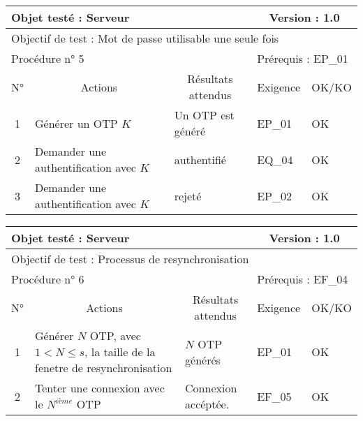 \documentclass{"../../res/univ-projet"}
\begin{document}
\begin{center}
    \begin{tabular}{|c|p{5cm}|p{5cm}|p{1.5cm}|p{1.5cm}|}
      \hline
      \multicolumn{3}{|l|}{Objet testé : Serveur} & \multicolumn{2}{c|}{Version : 1.0}\\ \hline
      \multicolumn{5}{|l|}{Objectif de test : Mot de passe utilisable une seule fois}\\ \hline
      \multicolumn{3}{|l|}{Procédure n° 5} & \multicolumn{2}{p{3cm}|}{Prérequis : EP\_01}\\ \hline
      \multicolumn{1}{|c|}{N°} & \multicolumn{1}{c|}{Actions} & \multicolumn{1}{c|}{Résultats attendus} & 
      \multicolumn{1}{c|}{Exigence} & \multicolumn{1}{c|}{OK/KO}\\ \hline
      1 & Générer un OTP $K$& Un OTP est généré & EP\_01 & OK \\
      2 & Demander une authentification avec $K$ & authentifié & EQ\_04 & OK\\
      3 & Demander une authentification avec $K$ & rejeté & EP\_02 & OK\\ \hline
    \end{tabular}
    \begin{tabular}{|c|p{5cm}|p{5cm}|p{1.5cm}|p{1.5cm}|}
      \hline
      \multicolumn{3}{|l|}{Objet testé : Serveur} & \multicolumn{2}{c|}{Version : 1.0}\\ \hline
      \multicolumn{5}{|l|}{Objectif de test : Processus de resynchronisation}\\ \hline
      \multicolumn{3}{|l|}{Procédure n° 6} & \multicolumn{2}{p{3cm}|}{Prérequis : EF\_04 }\\ \hline
      \multicolumn{1}{|c|}{N°} & \multicolumn{1}{c|}{Actions} & \multicolumn{1}{c|}{Résultats attendus} & 
      \multicolumn{1}{c|}{Exigence} & \multicolumn{1}{c|}{OK/KO}\\ \hline
      1 & Générer $N$ OTP, avec $1 < N \leq{} s$, la taille de la fenetre de resynchronisation& $N$ OTP générés & EP\_01 & OK \\
      2 & Tenter une connexion avec le $N^{ième}$ OTP & Connexion accéptée. & EF\_05 & OK \\ \hline      
    \end{tabular}    

\end{center}
\end{document}
